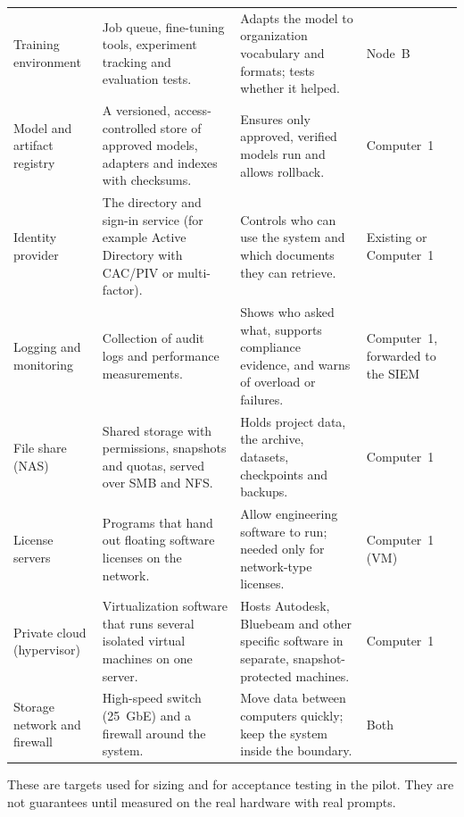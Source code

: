 {\begin{xltabular}{\textwidth}{@{}Y{0.8} Y{1.3} Y{1.2} Y{0.7}@{}}
  Training environment & Job queue, fine-tuning tools, experiment tracking and evaluation tests. & Adapts the model to organization vocabulary and formats; tests whether it helped. & Node~B \\
  Model and artifact registry & A versioned, access-controlled store of approved models, adapters and indexes with checksums. & Ensures only approved, verified models run and allows rollback. & Computer~1 \\
  Identity provider & The directory and sign-in service (for example Active Directory with CAC/PIV or multi-factor). & Controls who can use the system and which documents they can retrieve. & Existing or Computer~1 \\
  Logging and monitoring & Collection of audit logs and performance measurements. & Shows who asked what, supports compliance evidence, and warns of overload or failures. & Computer~1, forwarded to the SIEM \\
  File share (NAS) & Shared storage with permissions, snapshots and quotas, served over SMB and NFS. & Holds project data, the archive, datasets, checkpoints and backups. & Computer~1 \\
  License servers & Programs that hand out floating software licenses on the network. & Allow engineering software to run; needed only for network-type licenses. & Computer~1 (VM) \\
  Private cloud (hypervisor) & Virtualization software that runs several isolated virtual machines on one server. & Hosts Autodesk, Bluebeam and other specific software in separate, snapshot-protected machines. & Computer~1 \\
  Storage network and firewall & High-speed switch (25~GbE) and a firewall around the system. & Move data between computers quickly; keep the system inside the boundary. & Both \\
  \bottomrule
\end{xltabular}}


These are targets used for sizing and for acceptance testing in the pilot. They are not
guarantees until measured on the real hardware with real prompts.

